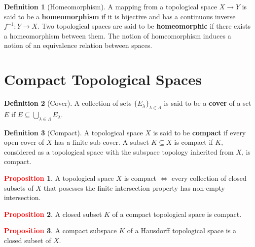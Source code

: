 \documentclass[11pt]{article}
\theoremstyle{definition}
\theoremstyle{definition}
\theoremstyle{definition}
\newtheorem{definition}{\textcolor{OliveGreen}{Definition}}
\newtheorem{prop}{\textcolor{red}{Proposition}}
\theoremstyle{remark}
\begin{document}
\begin{definition}[Homeomorphism]
	A mapping from a topological space $X \rightarrow Y$ is said to be a \textbf{homeomorphism} if it is bijective and has a continuous inverse $f^{-1}: Y \rightarrow X$. Two topological spaces are said to be \textbf{homeomorphic} if there exists a homeomorphism between them. The notion of homeomorphism induces a notion of an equivalence relation between spaces. 
\end{definition}

\section{Compact Topological Spaces}

\begin{definition}[Cover]
	A collection of sets $\{ E_\lambda \}_{\lambda \in \Lambda }$ is said to be a \textbf{cover} of a set $E$ if $E \subseteq \bigcup_{\lambda \in \Lambda } E_\lambda$. 
\end{definition}

\begin{definition}[Compact]
	A topological space $X$ is said to be \textbf{compact} if every open cover of $X$ has a finite sub-cover. A subset $K \subseteq X$ is compact if $K$, considered as a topological space with the subspace topology inherited from $X$, is compact. 
\end{definition}

\begin{prop}
	A topological space $X$ is compact $\iff$ every collection of closed subsets of $X$ that posesses the finite intersection property has non-empty intersection. 
\end{prop}

\begin{prop}
	A closed subset $K$ of a compact topological space is compact. 
\end{prop}

\begin{prop}
	A compact subspace $K$ of a Hausdorff topological space is a closed subset of $X$. 
\end{prop}
\end{document}
